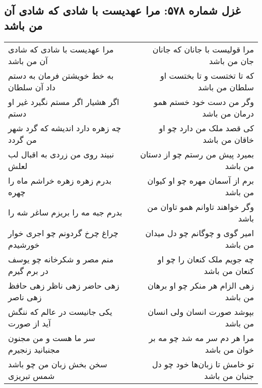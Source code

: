 \begin{center}
\section*{غزل شماره ۵۷۸: مرا عهدیست با شادی که شادی آن من باشد}
\label{sec:0578}
\begin{longtable}{l p{0.5cm} r}
مرا عهدیست با شادی که شادی آن من باشد
&&
مرا قولیست با جانان که جانان جان من باشد
\\
به خط خویشتن فرمان به دستم داد آن سلطان
&&
که تا تختست و تا بختست او سلطان من باشد
\\
اگر هشیار اگر مستم نگیرد غیر او دستم
&&
وگر من دست خود خستم همو درمان من باشد
\\
چه زهره دارد اندیشه که گرد شهر من گردد
&&
کی قصد ملک من دارد چو او خاقان من باشد
\\
نبیند روی من زردی به اقبال لب لعلش
&&
بمیرد پیش من رستم چو از دستان من باشد
\\
بدرم زهره زهره خراشم ماه را چهره
&&
برم از آسمان مهره چو او کیوان من باشد
\\
بدرم جبه مه را بریزم ساغر شه را
&&
وگر خواهند تاوانم همو تاوان من باشد
\\
چراغ چرخ گردونم چو اجری خوار خورشیدم
&&
امیر گوی و چوگانم چو دل میدان من باشد
\\
منم مصر و شکرخانه چو یوسف در برم گیرم
&&
چه جویم ملک کنعان را چو او کنعان من باشد
\\
زهی حاضر زهی ناظر زهی حافظ زهی ناصر
&&
زهی الزام هر منکر چو او برهان من باشد
\\
یکی جانیست در عالم که ننگش آید از صورت
&&
بپوشد صورت انسان ولی انسان من باشد
\\
سر ما هست و من مجنون مجنبانید زنجیرم
&&
مرا هر دم سر مه شد چو مه بر خوان من باشد
\\
سخن بخش زبان من چو باشد شمس تبریزی
&&
تو خامش تا زبان‌ها خود چو دل جنبان من باشد
\\
\end{longtable}
\end{center}

